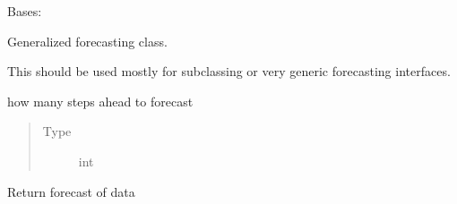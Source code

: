 \documentclass[letterpaper,10pt,english]{sphinxmanual}
\begin{document}
\begin{fulllineitems}
\label{\detokenize{dalio.pipe:dalio.pipe.forecast.Forecast}}
Bases: {\hyperref[\detokenize{dalio.pipe:dalio.pipe.pipe.Pipe}]{}}

Generalized forecasting class.

This should be used mostly for subclassing or very generic forecasting
interfaces.

\begin{fulllineitems}
\label{\detokenize{dalio.pipe:dalio.pipe.forecast.Forecast.horizon}}
how many steps ahead to forecast
\begin{quote}\begin{description}
\item[{Type}] \leavevmode
int

\end{description}\end{quote}

\end{fulllineitems}


\begin{fulllineitems}
\end{fulllineitems}


\begin{fulllineitems}
\label{\detokenize{dalio.pipe:dalio.pipe.forecast.Forecast.transform}}
Return forecast of data

\end{fulllineitems}


\end{fulllineitems}
\end{document}
